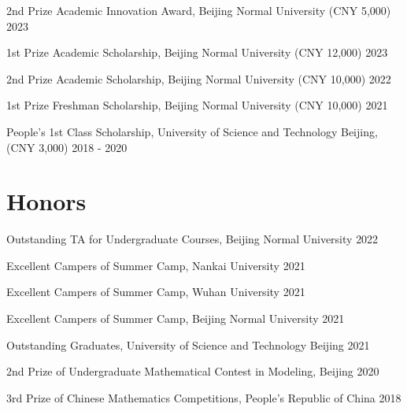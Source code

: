 \documentclass[a4paper,11pt]{article}
\begin{document}
\begin{description}[font=$\bullet$]
    \item {2nd Prize Academic Innovation Award,
    Beijing Normal University (CNY 5,000)} 
    \hfill{2023}
          \vspace{-5pt}
    \item {1st Prize Academic Scholarship, Beijing Normal University
    (CNY 12,000)} 
    \hfill{2023}
    \vspace{-5pt}
    \item {2nd Prize Academic Scholarship, Beijing Normal University
    (CNY 10,000)} 
    \hfill{2022}
    \vspace{-5pt}
    \item {1st Prize Freshman Scholarship, Beijing Normal University
    (CNY 10,000)} 
    \hfill{2021}
    \vspace{-5pt}
    \item {People's 1st Class Scholarship, University of Science and Technology Beijing, (CNY 3,000)}
    \hfill{2018 - 2020}
    \vspace{-5pt}
\end{description}
\vspace{2pt}  

\section{\bfseries{Honors}}
\begin{description}[font=$\bullet$]   
    \item {Outstanding TA for Undergraduate Courses, Beijing Normal University}
    \hfill{2022}
          \vspace{-5pt}

    \item {Excellent Campers of Summer Camp, Nankai University}
    \hfill{2021}
    \vspace{-5pt}
    \item {Excellent Campers of Summer Camp, Wuhan University}
    \hfill{2021}
    \vspace{-5pt}
    \item {Excellent Campers of Summer Camp, Beijing Normal University}
    \hfill{2021}
          \vspace{-5pt}
    \item {Outstanding Graduates, University of Science and Technology Beijing}
    \hfill{2021}
          \vspace{-5pt}
    \item {2nd Prize of Undergraduate Mathematical Contest in Modeling, Beijing}
    \hfill{2020}
    \vspace{-5pt}
    \item {3rd Prize of Chinese Mathematics Competitions, People’s Republic of China}
    \hfill{2018}
    \vspace{-5pt}
\end{description}
\end{document}
